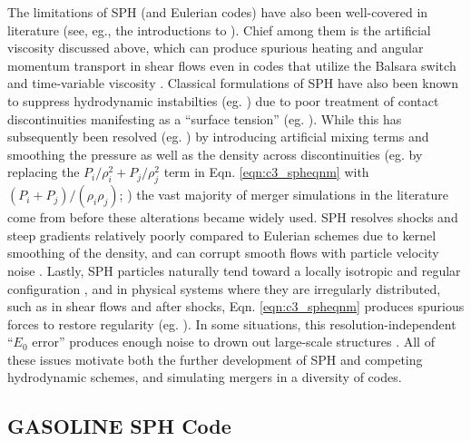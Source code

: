 The limitations of SPH (and Eulerian codes) have also been well-covered in literature (see, eg., the introductions to \citealt{spri10, hopk15, katz+16}).  Chief among them is the artificial viscosity discussed above, which can produce spurious heating and angular momentum transport in shear flows even in codes that utilize the Balsara switch and time-variable viscosity \citep{culld10}.  Classical formulations of SPH have also been known to suppress hydrodynamic instabilties (eg. \citealt{ager+07}) due to poor treatment of contact discontinuities manifesting as a ``surface tension'' (eg. \citealt{readha10, hesss10}).  While this has subsequently been resolved (eg. \citealt{hopk13, hu+14, kell+14}) by introducing artificial mixing terms \citep{pric08} and smoothing the pressure as well as the density across discontinuities (eg. by replacing the $P_i/\rho_i^2 + P_j/\rho_j^2$ term in Eqn. \ref{eqn:c3_spheqnm} with $(P_i + P_j)/(\rho_i\rho_j)$; \citealt{kell+14}) the vast majority of merger simulations in the literature come from before these alterations became widely used.  SPH resolves shocks and steep gradients relatively poorly compared to Eulerian schemes due to kernel smoothing of the density, and can corrupt smooth flows with particle velocity noise \citep{spri10rev}.  Lastly, SPH particles naturally tend toward a locally isotropic and regular configuration \citep{pric12}, and in physical systems where they are irregularly distributed, such as in shear flows and after shocks, Eqn. \ref{eqn:c3_spheqnm} produces spurious forces to restore regularity (eg. \citealt{readha10, dehna12}).  In some situations, this resolution-independent ``$E_0$ error'' produces enough noise to drown out large-scale structures \citep{hopk15}.  All of these issues motivate both the further development of SPH and competing hydrodynamic schemes, and simulating mergers in a diversity of codes.


\subsection{GASOLINE SPH Code}
\label{ssec:c3_gasoline}

